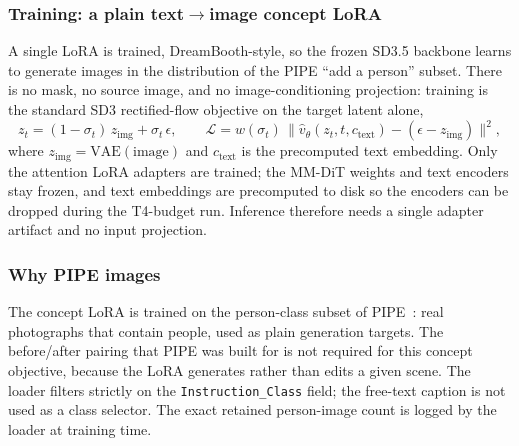 \documentclass[11pt,a4paper]{article}
\begin{document}
\subsubsection*{Training: a plain text$\to$image concept LoRA}
A single LoRA is trained, DreamBooth-style, so the frozen SD3.5 backbone learns to generate images in the distribution of the PIPE ``add a person'' subset. There is no mask, no source image, and no image-conditioning projection: training is the standard SD3 rectified-flow objective on the target latent alone,
\begin{equation}\label{eq:lora-cond}
  z_t = (1-\sigma_t)\,z_{\text{img}} + \sigma_t\,\epsilon,\qquad
  \mathcal{L} = w(\sigma_t)\,\big\lVert \hat v_\theta(z_t,t,c_{\text{text}})
  - (\epsilon - z_{\text{img}}) \big\rVert^2 ,
\end{equation}
where $z_{\text{img}}=\text{VAE}(\text{image})$ and $c_{\text{text}}$ is the precomputed text embedding. Only the attention LoRA adapters are trained; the MM-DiT weights and text encoders stay frozen, and text embeddings are precomputed to disk so the encoders can be dropped during the T4-budget run. Inference therefore needs a single adapter artifact and no input projection.

\subsubsection*{Why PIPE images}
The concept LoRA is trained on the person-class subset of PIPE~\cite{pipe}: real photographs that contain people, used as plain generation targets. The before/after pairing that PIPE was built for is not required for this concept objective, because the LoRA generates rather than edits a given scene. The loader filters strictly on the \texttt{Instruction\_Class} field; the free-text caption is not used as a class selector. The exact retained person-image count is logged by the loader at training time.
\end{document}
